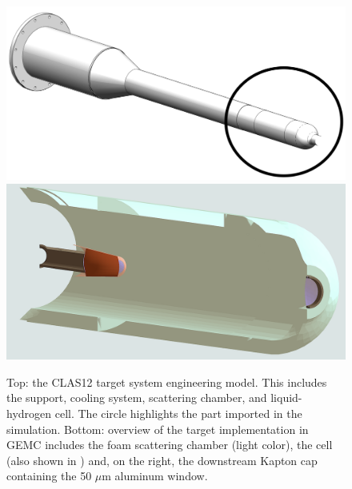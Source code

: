 \begin{figure}
	\centering
	\includegraphics[width=0.99\columnwidth,keepaspectratio]{img/targetOverview2.png}
	\includegraphics[width=0.99\columnwidth,keepaspectratio]{img/targetOverview1.png}
	\caption{Top: the CLAS12 target system engineering model. This includes the support, cooling system, scattering chamber, and
			 liquid-hydrogen cell. The circle highlights the part imported in the simulation.
			 Bottom: overview of the target implementation in GEMC includes the foam scattering chamber (light color), the
			 cell (also shown in ) and, on the right, the downstream Kapton cap containing the 50 $\mu$m aluminum window. }
	\label{fig:targetOverview}
\end{figure}






